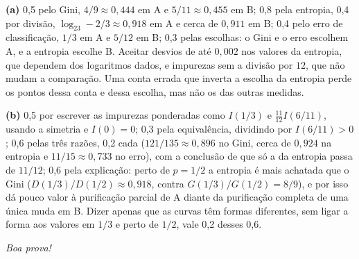 \documentclass[11pt,a4paper]{article}
\begin{document}
\begin{criterio}
\textbf{(a)} 0,5 pelo Gini, $4/9\approx0{,}444$ em A e $5/11\approx0{,}455$ em B; 0,8 pela
entropia, 0,4 por divisão, $\log_23-2/3\approx0{,}918$ em A e cerca de $0{,}911$ em B; 0,4
pelo erro de classificação, $1/3$ em A e $5/12$ em B; 0,3 pelas escolhas: o Gini e o erro
escolhem A, e a entropia escolhe B. Aceitar desvios de até $0{,}002$ nos valores da
entropia, que dependem dos logaritmos dados, e impurezas sem a divisão por $12$, que
não mudam a comparação. Uma conta errada que inverta a escolha da entropia perde os
pontos dessa conta e dessa escolha, mas não os das outras medidas.

\textbf{(b)} 0,5 por escrever as impurezas ponderadas como $I(1/3)$ e
$\tfrac{11}{12}I(6/11)$, usando a simetria e $I(0)=0$; 0,3 pela equivalência, dividindo
por $I(6/11)>0$; 0,6 pelas três razões, 0,2 cada ($121/135\approx0{,}896$ no Gini, cerca de
$0{,}924$ na entropia e $11/15\approx0{,}733$ no erro), com a conclusão de que só a da
entropia passa de $11/12$; 0,6 pela explicação: perto de $p=1/2$ a entropia é mais
achatada que o Gini ($D(1/3)/D(1/2)\approx0{,}918$, contra $G(1/3)/G(1/2)=8/9$), e por isso
dá pouco valor à purificação parcial de A diante da purificação completa de uma única
muda em B. Dizer apenas que as curvas têm formas diferentes, sem ligar a forma aos
valores em $1/3$ e perto de $1/2$, vale 0,2 desses 0,6.
\end{criterio}

\vfill
\begin{center}\small\itshape Boa prova!\end{center}
\end{document}
